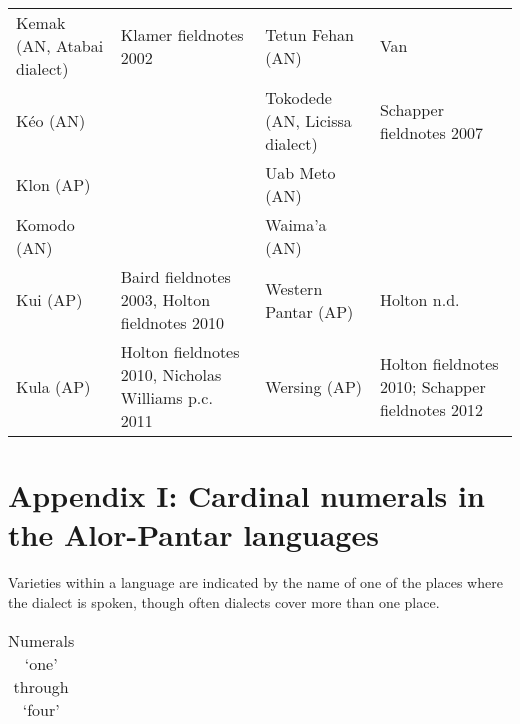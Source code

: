 {\begin{tabular}{llll}
Kemak (AN, Atabai dialect) & Klamer fieldnotes 2002 & Tetun Fehan (AN) & Van \citet[100]{Klinken1999}\\
K\'eo (AN) & \citet{Baird2002} & Tokodede (AN, Licissa dialect) & Schapper fieldnotes 2007\\
Klon (AP) & \citet{Baird2008} & Uab Meto (AN) & \citet[421-424]{Middelkoop1950}\\
Komodo (AN) & \citet{Verheijen1982} & Waima'a (AN) & \citet{Hull2002}\\
Kui (AP) & Baird fieldnotes 2003, Holton fieldnotes 2010 & Western Pantar (AP) & Holton n.d. \\
Kula (AP) & Holton fieldnotes 2010, Nicholas Williams p.c. 2011 & Wersing (AP) & Holton fieldnotes 2010; Schapper fieldnotes 2012\\
\end{tabular}


\section*{Appendix I: Cardinal numerals in the Alor-Pantar languages}
Varieties within a language are indicated by the name of one of the places where the dialect is spoken, though often dialects cover more than one place.

\begin{table}\centering
\caption{Numerals `one' through `four'}





\begin{tabular}{llllll}



\end{tabular}
\end{table}}
